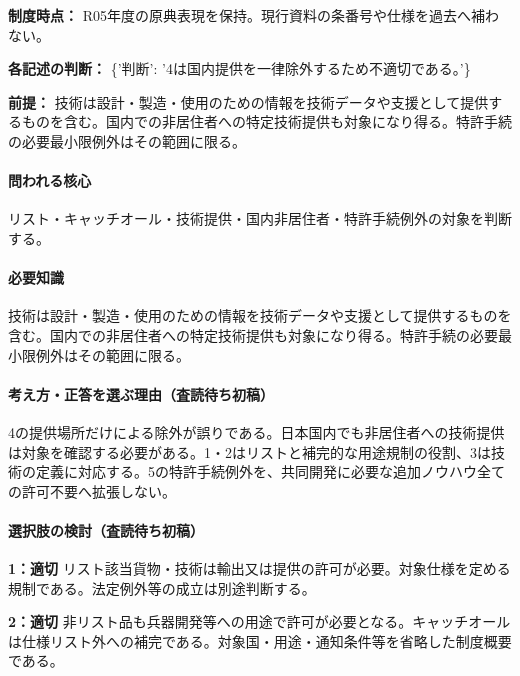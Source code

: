 \noindent\textbf{制度時点：} R05年度の原典表現を保持。現行資料の条番号や仕様を過去へ補わない。\par

\noindent\textbf{各記述の判断：} \{'判断': '4は国内提供を一律除外するため不適切である。'\}\par

\noindent\textbf{前提：} 技術は設計・製造・使用のための情報を技術データや支援として提供するものを含む。国内での非居住者への特定技術提供も対象になり得る。特許手続の必要最小限例外はその範囲に限る。\par

\paragraph{問われる核心} リスト・キャッチオール・技術提供・国内非居住者・特許手続例外の対象を判断する。

\paragraph{必要知識} 技術は設計・製造・使用のための情報を技術データや支援として提供するものを含む。国内での非居住者への特定技術提供も対象になり得る。特許手続の必要最小限例外はその範囲に限る。

\paragraph{考え方・正答を選ぶ理由（査読待ち初稿）} 4の提供場所だけによる除外が誤りである。日本国内でも非居住者への技術提供は対象を確認する必要がある。1・2はリストと補完的な用途規制の役割、3は技術の定義に対応する。5の特許手続例外を、共同開発に必要な追加ノウハウ全ての許可不要へ拡張しない。

\paragraph{選択肢の検討（査読待ち初稿）}\mbox{}\par

\noindent\textbf{1：適切} リスト該当貨物・技術は輸出又は提供の許可が必要。対象仕様を定める規制である。法定例外等の成立は別途判断する。\par

\noindent\textbf{2：適切} 非リスト品も兵器開発等への用途で許可が必要となる。キャッチオールは仕様リスト外への補完である。対象国・用途・通知条件等を省略した制度概要である。\par

